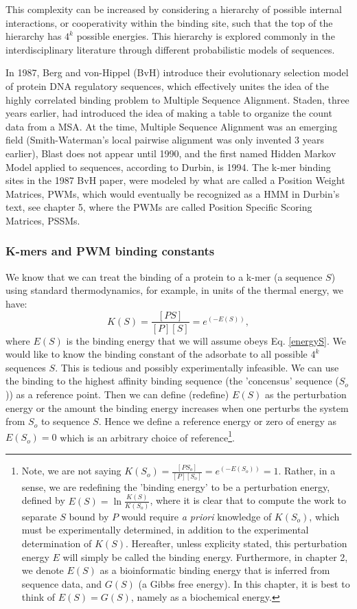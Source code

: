   This complexity can be increased by considering a hierarchy of possible internal interactions, or cooperativity within the binding site, such that the top of the hierarchy has $4^k$ possible energies.  This hierarchy is explored commonly in the interdisciplinary literature through different probabilistic models of sequences. 

In 1987, Berg and von-Hippel (BvH) introduce their evolutionary selection model of protein DNA regulatory sequences, which effectively unites the idea of the highly correlated binding problem to Multiple Sequence Alignment.  Staden, three years earlier, had introduced the idea of making a table to organize the count data from a MSA.  At the time, Multiple Sequence Alignment was an emerging field (Smith-Waterman's local pairwise alignment was only invented 3 years earlier), Blast does not appear until 1990, and the first named Hidden Markov Model applied to sequences, according to Durbin, is 1994\cite{BSA}.  The k-mer binding sites in the 1987 BvH paper\cite{pmid3612791}, were modeled by what are called a Position Weight Matrices, PWMs, which would eventually be recognized as a HMM in Durbin's text\cite{BSA}, see chapter 5, where the PWMs are called Position Specific Scoring Matrices, PSSMs.



\subsubsection{K-mers and PWM binding constants}
We know that we can treat the binding of a protein to a k-mer (a sequence $S$) using standard thermodynamics, for example, in units of the thermal energy, we have:
\begin{equation}\label{}
  K(S) = \frac{[PS]}{[P][S]} = e^{(-E(S))},
\end{equation}
where $E(S)$ is the binding energy that we will assume obeys Eq. \ref{energyS}.
We would like to know the binding constant of the adsorbate to all possible $4^k$ sequences $S$.  This is tedious and possibly experimentally infeasible.  We can use the binding to the highest affinity binding sequence (the 'concensus' sequence ($S_o$)) as a reference point.  Then we can define (redefine) $E(S)$ as the perturbation energy or the amount the binding energy increases when one perturbs the system from $S_o$ to sequence $S$.  Hence we define a reference energy or zero of energy as $E(S_o)=0$ which is an arbitrary choice of reference\footnote{Note, we are not saying $K(S_o)= \frac{[PS_o]}{[P][S_o]} = e^{(-E(S_o))}=1$.  Rather, in a sense, we are redefining the 'binding energy' to be a perturbation energy, defined by $E(S) =\ln \frac{K(S)}{K(S_o)}$, where it is clear that to compute the work to separate $S$ bound by $P$ would require \textit{a priori} knowledge of $K(S_o)$, which must be experimentally determined, in addition to the experimental determination of $K(S)$.  Hereafter, unless explicity stated, this perturbation energy $E$ will simply be called the binding energy.  Furthermore, in chapter 2, we denote $E(S)$ as a bioinformatic binding energy that is inferred from sequence data, and $G(S)$ (a Gibbs free energy).  In this chapter, it is best to think of $E(S)=G(S)$, namely as a biochemical energy.}.  

